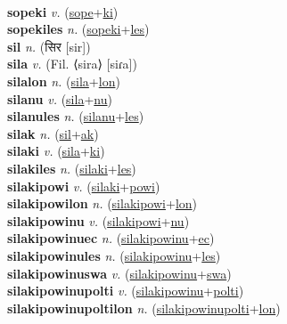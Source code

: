  \label{sopelon} \\
\textbf{sopeki} \textit{v.} (\hyperref[sope]{sope}+\hyperref[ki]{ki})
 \label{sopeki} \\
\textbf{sopekiles} \textit{n.} (\hyperref[sopeki]{sopeki}+\hyperref[les]{les})
 \label{sopekiles} \\
\textbf{sil} \textit{n.} ({\devanagari{}सिर} [sir])
 \label{sil} \\
\textbf{sila} \textit{v.} (Fil. ⟨sira⟩ [siɾa])
 \label{sila} \\
\textbf{silalon} \textit{n.} (\hyperref[sila]{sila}+\hyperref[lon]{lon})
 \label{silalon} \\
\textbf{silanu} \textit{v.} (\hyperref[sila]{sila}+\hyperref[nu]{nu})
 \label{silanu} \\
\textbf{silanules} \textit{n.} (\hyperref[silanu]{silanu}+\hyperref[les]{les})
 \label{silanules} \\
\textbf{silak} \textit{n.} (\hyperref[sil]{sil}+\hyperref[ak]{ak})
 \label{silak} \\
\textbf{silaki} \textit{v.} (\hyperref[sila]{sila}+\hyperref[ki]{ki})
 \label{silaki} \\
\textbf{silakiles} \textit{n.} (\hyperref[silaki]{silaki}+\hyperref[les]{les})
 \label{silakiles} \\
\textbf{silakipowi} \textit{v.} (\hyperref[silaki]{silaki}+\hyperref[powi]{powi})
 \label{silakipowi} \\
\textbf{silakipowilon} \textit{n.} (\hyperref[silakipowi]{silakipowi}+\hyperref[lon]{lon})
 \label{silakipowilon} \\
\textbf{silakipowinu} \textit{v.} (\hyperref[silakipowi]{silakipowi}+\hyperref[nu]{nu})
 \label{silakipowinu} \\
\textbf{silakipowinuec} \textit{n.} (\hyperref[silakipowinu]{silakipowinu}+\hyperref[ec]{ec})
 \label{silakipowinuec} \\
\textbf{silakipowinules} \textit{n.} (\hyperref[silakipowinu]{silakipowinu}+\hyperref[les]{les})
 \label{silakipowinules} \\
\textbf{silakipowinuswa} \textit{v.} (\hyperref[silakipowinu]{silakipowinu}+\hyperref[swa]{swa})
 \label{silakipowinuswa} \\
\textbf{silakipowinupolti} \textit{v.} (\hyperref[silakipowinu]{silakipowinu}+\hyperref[polti]{polti})
 \label{silakipowinupolti} \\
\textbf{silakipowinupoltilon} \textit{n.} (\hyperref[silakipowinupolti]{silakipowinupolti}+\hyperref[lon]{lon})
 \label{silakipowinupoltilon} \\

